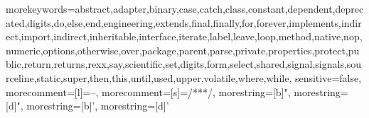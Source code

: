 {morekeywords={abstract,adapter,binary,case,catch,class,constant,dependent,deprecated,digits,do,else,end,engineering,extends,final,finally,for,forever,implements,indirect,import,indirect,inheritable,interface,iterate,label,leave,loop,method,native,nop,numeric,options,otherwise,over,package,parent,parse,private,properties,protect,public,return,returns,rexx,say,scientific,set,digits,form,select,shared,signal,signals,sourceline,static,super,then,this,until,used,upper,volatile,where,while},
sensitive=false,
morecomment=[l]={--},
morecomment=[s]={/**}{*/},
morestring=[b]",
morestring=[d]",
morestring=[b]',
morestring=[d]'}

\lstset{language=NetRexx,
  alsolanguage=Java,
  basicstyle=\small,
  stringstyle=\ttfamily}
